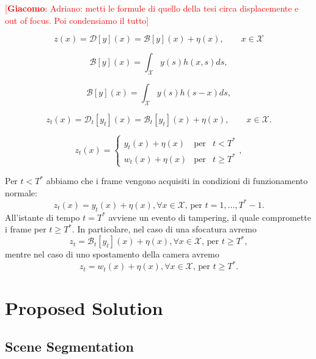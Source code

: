 \documentclass{llncs}
\newcommand{\gi}[1]{{\textcolor{red}{[\small \textbf{Giacomo}: #1]}}}
\begin{document}
\gi{Adriano: metti le formule di quello della tesi circa displacemente e out of focus. Poi condensiamo il tutto}


\begin{equation}
\label{eq:blur_single}
z(x)=\mathcal{D}[y](x) = \mathcal{B}[y](x) + \eta(x), \qquad x \in \mathcal{X}
\end{equation}


\begin{equation}
\label{eq:blur}
\mathcal{B}[y](x) = \int_{\mathcal{X}}y(s)h(x,s)ds,
\end{equation}


\begin{equation}
\label{eq:blur_convolution}
\mathcal{B}[y](x) = \int_{\mathcal{X}}y(s)h(s-x)ds,
\end{equation}

\begin{equation}
\label{eq:blur_multi}
z_t(x)=\mathcal{D}_t[y_t](x) = \mathcal{B}_t[y_t](x) + \eta(x), \qquad x \in \mathcal{X}.
\end{equation}

\begin{equation}
\label{eq:displacement}
z_t(x)  = \left\{ \begin{array}{rcl}
y_t(x) + \eta(x) & \mbox{per} & t < T^* \\
w_t(x) + \eta(x) & \mbox{per} & t \geqslant T^*
\end{array}\right. ,
\end{equation}


Per $t<T^*$ abbiamo che i frame vengono acquisiti in condizioni di funzionamento normale:
\[ z_t(x)=y_t(x) + \eta(x), \forall x \in \mathcal{X} \mbox{, per } t=1,\dots , T^*-1. \] 
All'istante di tempo $t = T^*$ avviene un evento di tampering, il quale compromette i frame per $t\geq T^*$.  
In particolare, nel caso di una sfocatura avremo
\[ z_t = \mathcal{B}_t[y_t](x) + \eta(x), \forall x \in \mathcal{X} \mbox{, per } t \geq T^*,\]
mentre nel caso di uno spostamento della camera avremo
\[ z_t = w_t(x) + \eta(x), \forall x \in \mathcal{X} \mbox{, per } t \geq T^*. \]



\section{Proposed Solution}\label{sec:propSol}




\subsection{Scene Segmentation}\label{subsec:Segmentation}
\end{document}
